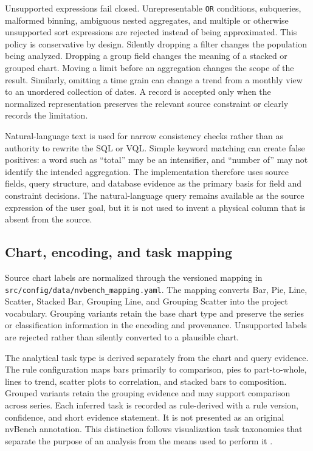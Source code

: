Unsupported expressions fail closed. Unrepresentable \texttt{OR} conditions, subqueries, malformed binning, ambiguous nested aggregates, and multiple or otherwise unsupported sort expressions are rejected instead of being approximated. This policy is conservative by design. Silently dropping a filter changes the population being analyzed. Dropping a group field changes the meaning of a stacked or grouped chart. Moving a limit before an aggregation changes the scope of the result. Similarly, omitting a time grain can change a trend from a monthly view to an unordered collection of dates. A record is accepted only when the normalized representation preserves the relevant source constraint or clearly records the limitation.

Natural-language text is used for narrow consistency checks rather than as authority to rewrite the SQL or VQL. Simple keyword matching can create false positives: a word such as ``total'' may be an intensifier, and ``number of'' may not identify the intended aggregation. The implementation therefore uses source fields, query structure, and database evidence as the primary basis for field and constraint decisions. The natural-language query remains available as the source expression of the user goal, but it is not used to invent a physical column that is absent from the source.

\subsection{Chart, encoding, and task mapping}

Source chart labels are normalized through the versioned mapping in \nolinkurl{src/config/data/nvbench_mapping.yaml}. The mapping converts Bar, Pie, Line, Scatter, Stacked Bar, Grouping Line, and Grouping Scatter into the project vocabulary. Grouping variants retain the base chart type and preserve the series or classification information in the encoding and provenance. Unsupported labels are rejected rather than silently converted to a plausible chart.

The analytical task type is derived separately from the chart and query evidence. The rule configuration maps bars primarily to comparison, pies to part-to-whole, lines to trend, scatter plots to correlation, and stacked bars to composition. Grouped variants retain the grouping evidence and may support comparison across series. Each inferred task is recorded as rule-derived with a rule version, confidence, and short evidence statement. It is not presented as an original nvBench annotation. This distinction follows visualization task taxonomies that separate the purpose of an analysis from the means used to perform it \cite{brehmer2013typology}.

